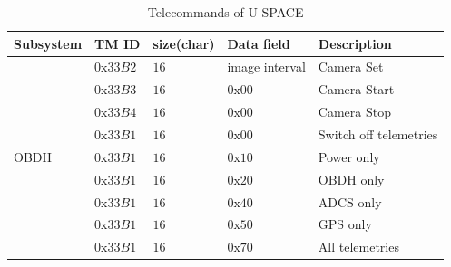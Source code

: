\begin{table}[bht]
\centering
\caption[Telecommand list of the U-SPACE]{Telecommands of \ac{U-SPACE}}
\label{tab:telecommand_uspace}
\begin{tabular}{|m{}m{}m{}m{}m{}|}
\hline
\textbf{Subsystem}		&  		\textbf{TM ID}				&	\textbf{size(char)}		&	\textbf{Data field}	& 		\textbf{Description}  	  \\ 
\hline\hline
\multirow{9}{*}{OBDH}   &    $ 0\text{x}33B2 $				&	$ 16 $					&	image interval		&      Camera Set			      \\
						&    $ 0\text{x}33B3 $				&	$ 16 $					&	$ 0\text{x}00 $		&      Camera Start	   		      \\
						&    $ 0\text{x}33B4 $				&	$ 16 $					&	$ 0\text{x}00 $		&      Camera Stop		      	  \\
						&    $ 0\text{x}33B1 $				&	$ 16 $					&	$ 0\text{x}00 $		&      Switch off telemetries	  \\
						&    $ 0\text{x}33B1 $				&	$ 16 $					&	$ 0\text{x}10 $		&      Power only	   		      \\
						&    $ 0\text{x}33B1 $				&	$ 16 $					&	$ 0\text{x}20 $		&      \ac{OBDH} only	      	  \\
						&    $ 0\text{x}33B1 $				&	$ 16 $					&	$ 0\text{x}40 $		&      ADCS only			      \\
						&    $ 0\text{x}33B1 $				&	$ 16 $					&	$ 0\text{x}50 $		&      GPS only		   		      \\
						&    $ 0\text{x}33B1 $				&	$ 16 $					&	$ 0\text{x}70 $		&      All telemetries	      	  \\
\hline
\end{tabular}
\end{table}
